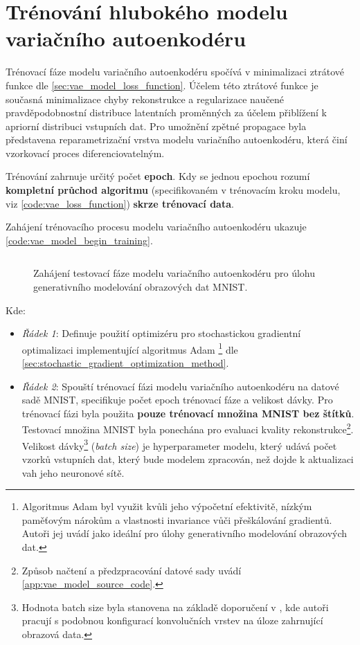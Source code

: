 \newpage
\section{Trénování hlubokého modelu variačního autoenkodéru}
Trénovací fáze modelu variačního autoenkodéru spočívá v minimalizaci ztrátové funkce dle \autoref{sec:vae_model_loss_function}.
Účelem této ztrátové funkce je současná minimalizace chyby rekonstrukce a regularizace naučené pravděpodobnostní distribuce latentních proměnných za účelem přiblížení k apriorní distribuci vstupních dat.
Pro umožnění zpětné propagace byla představena reparametrizační vrstva modelu variačního autoenkodéru, která činí vzorkovací proces diferenciovatelným.

Trénování zahrnuje určitý počet \textbf{epoch}. Kdy se jednou epochou rozumí \textbf{kompletní průchod algoritmu} (specifikovaném v trénovacím kroku modelu, viz \autoref{code:vae_loss_function}) \textbf{skrze trénovací data}.

Zahájení trénovacího procesu modelu variačního autoenkodéru ukazuje \autoref{code:vae_model_begin_training}. 

\begin{figure}[H]
    \inputminted[linenos]{python}{code_snippets/vae_train.py}
    \caption{Zahájení testovací fáze modelu variačního autoenkodéru pro úlohu generativního modelování obrazových dat MNIST.}
    \label{code:vae_model_begin_training}
\end{figure}

Kde:
\begin{itemize}
    \item \emph{Řádek 1}: Definuje použití optimizéru pro stochastickou gradientní optimalizaci implementující algoritmus Adam \cite{Kingma2017} \footnote{Algoritmus Adam byl využit kvůli jeho výpočetní efektivitě, nízkým paměťovým nárokům a vlastnosti invariance vůči přeškálování gradientů. Autoři \textcite{Kingma2017} jej uvádí jako ideální pro úlohy generativního modelování obrazových dat.} dle \autoref{sec:stochastic_gradient_optimization_method}.
    \item \emph{Řádek 2}: Spouští trénovací fázi modelu variačního autoenkodéru na datové sadě MNIST, specifikuje počet epoch trénovací fáze a velikost dávky. Pro trénovací fázi byla použita \textbf{pouze trénovací množina MNIST bez štítků}. Testovací množina MNIST byla ponechána pro evaluaci kvality rekonstrukce\footnote{Způsob načtení a předzpracování datové sady uvádí \autoref{app:vae_model_source_code}.}. Velikost dávky\footnote{Hodnota batch size byla stanovena na základě doporučení v \textcite{Mishkin2017}, kde autoři pracují s podobnou konfigurací konvolučních vrstev na úloze zahrnující obrazová data.} (\emph{batch size}) je hyperparameter modelu, který udává počet vzorků vstupních dat, který bude modelem zpracován, než dojde k aktualizaci vah jeho neuronové sítě. 
\end{itemize}

